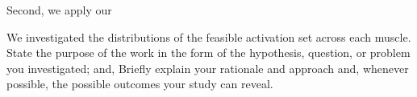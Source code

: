 Second, we apply our 

We investigated the distributions of the feasible activation set across each muscle.
State the purpose of the work in the form of the hypothesis, question, or problem you investigated; and,
Briefly explain your rationale and approach and, whenever possible, the possible outcomes your study can reveal.
